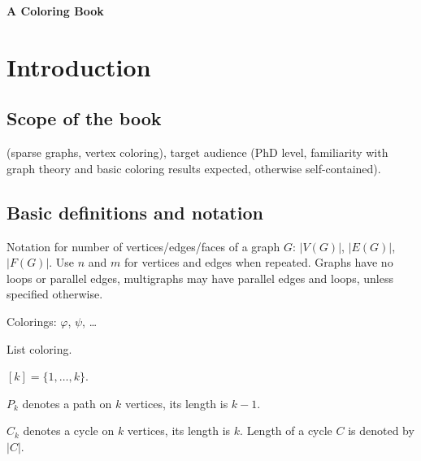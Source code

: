 \documentclass[12pt,twoside,openright,a4paper]{book}
\begin{document}
\pagestyle{empty}
\begin{titlepage}

\begin{center}

\vspace{10cm}

{\large\bf A Coloring Book}

\end{center}
\end{titlepage}

\newpage

\pagestyle{plain}
\tableofcontents

\newpage

\pagestyle{headings}
\setcounter{page}{1}

\chapter*{Introduction}

\section{Scope of the book}

(sparse graphs, vertex coloring), target audience (PhD level,
familiarity with graph theory and basic coloring results expected, otherwise self-contained).

\section{Basic definitions and notation}


Notation for number of vertices/edges/faces of a graph $G$:
$|V(G)|$, $|E(G)|$, $|F(G)|$.
Use $n$ and $m$ for vertices and edges when repeated.
Graphs have no loops or parallel edges, multigraphs may have parallel edges and loops, unless specified otherwise.

Colorings: $\varphi$, $\psi$, \ldots

List coloring.

$[k]=\{1,\ldots,k\}$.

$P_k$ denotes a path on $k$ vertices, its length is $k-1$.

$C_k$ denotes a cycle on $k$ vertices, its length is $k$.  Length of a cycle $C$ is denoted by $|C|$.
\end{document}
